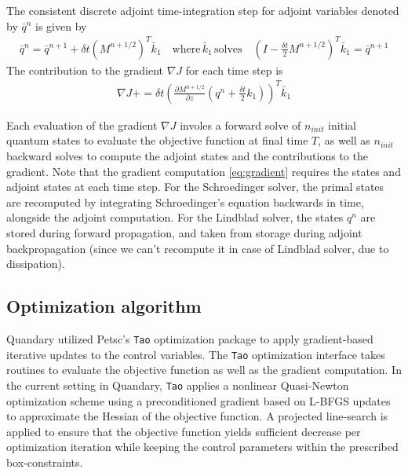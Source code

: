 \documentclass[11pt]{article}
\begin{document}
  The consistent discrete adjoint time-integration step for
    adjoint variables denoted by $\bar q^{n}$ is given by
   \begin{align}
      \bar q^{n} = \bar q^{n+1} + \delta t \left(M^{n+1/2}\right)^T \bar k_1
      \quad \text{where} \, \bar k_1 \, \text{solves} \quad \left(
      I-\frac{\delta t}{2} M^{n+1/2}\right)^T  \bar k_1 = \bar q^{n+1} 
    \end{align}
  The contribution to the gradient $\nabla J$ for each time step is
    \begin{align}\label{eq:gradient}
      \nabla J += \delta t \left( \frac{\partial M^{n+1/2}}{\partial z}
      \left(q^n + \frac{\delta t}{2} k_1\right) \right)^T\bar k_1
    \end{align}
  
    Each evaluation of the gradient $\nabla J$ involes a forward solve of $n_{init}$ initial quantum states to evaluate the objective function at final time $T$, as well as $n_{init}$ backward solves to compute the adjoint states and the contributions to the gradient. Note that the gradient computation \eqref{eq:gradient} requires the states and adjoint states at each time step. For the Schroedinger solver, the primal states are recomputed by integrating Schroedinger's equation backwards in time, alongside the adjoint computation. For the Lindblad solver, the states $q^n$ are stored during forward propagation, and taken from storage during adjoint backpropagation (since we can't recompute it in case of Lindblad solver, due to dissipation). 


  \subsection{Optimization algorithm}
    Quandary utilized Petsc's \texttt{Tao} optimization package to apply gradient-based iterative updates to the control variables. The \texttt{Tao} optimization interface takes routines to evaluate the objective function as well as the gradient computation. In the current setting in Quandary, \texttt{Tao} applies a nonlinear Quasi-Newton optimization scheme using a preconditioned gradient based on L-BFGS updates to approximate the Hessian of the objective function. A projected line-search is applied to ensure that the objective function yields sufficient decrease per optimization iteration while keeping the control parameters within the prescribed box-constraints. 
\end{document}
